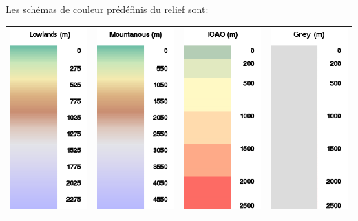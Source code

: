 Les schémas de couleur prédéfinis du relief sont:

\begin{longtable}{c c c c}
\includegraphics[angle=0,width=3.0cm,keepaspectratio='true']{figures/ramp-terrain-flatlands.png}&
\includegraphics[angle=0,width=3.0cm,keepaspectratio='true']{figures/ramp-terrain-mountanous.png}&
\includegraphics[angle=0,width=3.0cm,keepaspectratio='true']{figures/ramp-terrain-icao.png}&
\includegraphics[angle=0,width=3.0cm,keepaspectratio='true']{figures/ramp-terrain-grey.png}
\end{longtable}

